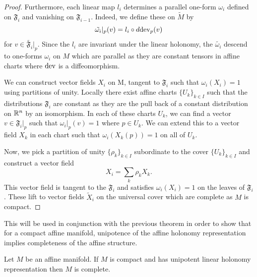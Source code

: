 \begin{proof}
    Furthermore, each linear map $l_i$ determines a parallel one-form $\omega_i$
    defined on $\mathfrak{F}_i$ and vanishing on $\mathfrak{F}_{i-1}$. Indeed, we
    define these on $\tilde{M}$ by $$ \tilde{\omega_i}|_p(v) = l_i \circ d
        \text{dev}_p(v) $$ for $v \in \tilde{\mathfrak{F}_i}|_p$. Since the $l_i$ are
    invariant under the linear holonomy, the $\tilde{\omega_i}$ descend to
    one-forms $\omega_i$ on $M$ which are parallel as they are constant tensors in
    affine charts where $\text{dev}$ is a diffeomorphism.

    We can construct vector fields $X_i$ on M, tangent to $\mathfrak{F}_i$ such
    that $\omega_i(X_i)=1$ using partitions of unity. Locally there exist affine
    charts $\{U_k\}_{k \in I}$ such that the distributions $\mathfrak{F}_i$ are
    constant as they are the pull back of a constant distribution on $\mathbb{R}^n$ by an
    isomorphism. In each of these charts $U_k$, we can find a vector $v \in
        \mathfrak{F}_i|_p$ such that $\omega_i|_p(v) = 1$ where $p \in U_k$. We can
    extend this to a vector field $X_k$ in each chart such that $\omega_i(X_k(p)) =
        1$ on all of $U_k$.

    Now, we pick a partition of unity $\{\rho_k\}_{k \in I}$ subordinate to the
    cover $\{U_k\}_{k \in I}$ and construct a vector field $$ X_i = \sum_k \rho_k
        X_k. $$ This vector field is tangent to the $\mathfrak{F}_i$ and satisfies
    $\omega_i(X_i) = 1$ on the leaves of $\mathfrak{F}_i$. These lift to vector
    fields $\tilde{X}_i$ on the universal cover which are complete as $M$ is
    compact.
\end{proof}

This will be used in conjunction with the previous theorem in order to show
that for a compact affine manifold, unipotence of the affine holonomy
representation implies completeness of the affine structure.

\begin{theorem}\label{thm:unipotent-complete}
    Let $M$ be an affine manifold. If $M$ is compact and has unipotent linear holonomy representation then $M$ is complete.
\end{theorem}

